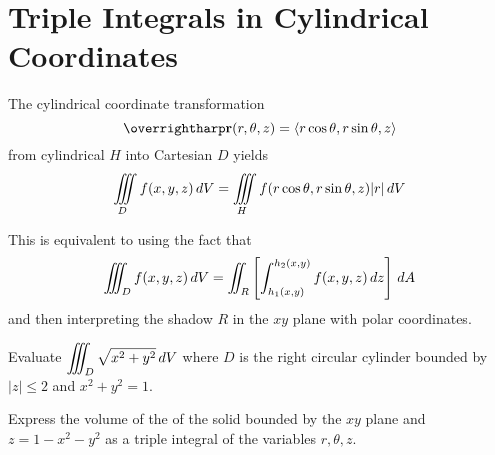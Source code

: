 \documentclass[letterpaper, twoside, 12pt]{book}
\begin{document}
          \begin{solution}

          \end{solution}

          \begin{contributors}

          \end{contributors}




\setcounter{section}{7}
\section{Triple Integrals in Cylindrical Coordinates} %

\begin{theorem}
  The cylindrical coordinate transformation
  \[
    \vect{r}(r,\theta,z)
      =
    \<r\cos\theta, r\sin\theta, z\>
  \]
  from cylindrical $H$ into Cartesian $D$ yields
  \[
    \iiint\limits_D f(x,y,z)\,d{V}
      =
    \iiint\limits_H f(r\cos\theta,r\sin\theta,z)|r|\,d{V}
  \]
\end{theorem}

\begin{remark}
  This is equivalent to using the fact that
  \[
    \iiint_D f(x,y,z)\,d{V}
      =
    \iint_R\left[ \int_{h_1(x,y)}^{h_2(x,y)} f(x,y,z) \,d{z} \right]\,d{A}
  \]
  and then interpreting the shadow $R$ in the $xy$ plane with polar
  coordinates.
\end{remark}

          \begin{problem}
            Evaluate $\displaystyle\iiint_D \sqrt{x^2+y^2}\,d{V}$ where $D$ is the
            right circular cylinder bounded by $|z|\leq 2$ and $x^2+y^2=1$.
          \end{problem}

          \begin{solution}

          \end{solution}

          \begin{contributors}

          \end{contributors}

          \begin{problem}
            Express the volume of the of the solid bounded by the $xy$ plane
            and $z=1-x^2-y^2$ as a triple integral of the variables
            $r,\theta,z$.
          \end{problem}
\end{document}
